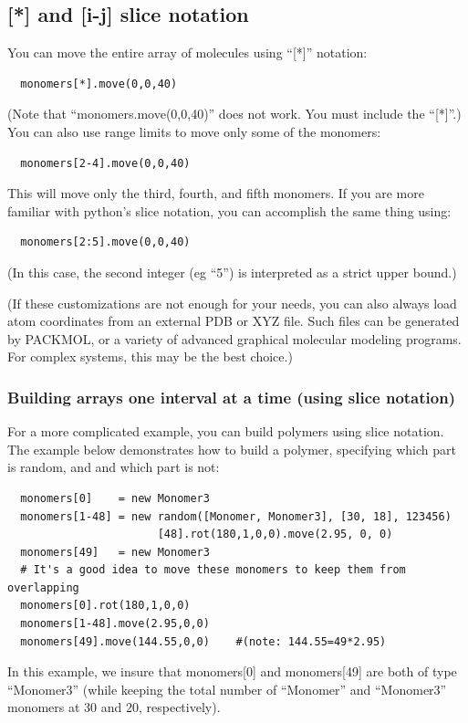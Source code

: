 \documentclass[11pt]{article}
\begin{document}
\subsection{[*] and [i-j] slice notation}
\label{sec:array_wildcards_intro}
You can move the entire array of molecules using ``[*]'' notation:
\begin{verbatim}
  monomers[*].move(0,0,40)
\end{verbatim}
(Note that ``monomers.move(0,0,40)'' does not work.
 You must include the ``[*]''.)
You can also use range limits to move only some of the monomers:
\begin{verbatim}
  monomers[2-4].move(0,0,40)
\end{verbatim}
This will move only the third, fourth, and fifth monomers.
If you are more familiar with python's slice notation, you can 
accomplish the same thing using:
\begin{verbatim}
  monomers[2:5].move(0,0,40)
\end{verbatim}
(In this case, the second integer (eg ``5'') is interpreted as a 
 strict upper bound.)

(If these customizations
 are not enough for your needs, you can also always load atom 
coordinates from an external PDB or XYZ file.
Such files can be generated by PACKMOL, 
or a variety of advanced graphical molecular modeling programs. 
For complex systems, this may be the best choice.)




\subsubsection{Building arrays one interval at a time (using slice notation)}

For a more complicated example, you can build polymers using slice notation.
The example below demonstrates how to build a polymer,
specifying which part is random, and and which part is not:

\begin{verbatim}
  monomers[0]    = new Monomer3
  monomers[1-48] = new random([Monomer, Monomer3], [30, 18], 123456)
                       [48].rot(180,1,0,0).move(2.95, 0, 0)
  monomers[49]   = new Monomer3
  # It's a good idea to move these monomers to keep them from overlapping
  monomers[0].rot(180,1,0,0)
  monomers[1-48].move(2.95,0,0)
  monomers[49].move(144.55,0,0)    #(note: 144.55=49*2.95)
\end{verbatim}
In this example, we insure that monomers[0] and monomers[49] are both
of type ``Monomer3'' 
(while keeping the total number of ``Monomer'' and ``Monomer3'' monomers at 
 30 and 20, respectively).
\end{document}
